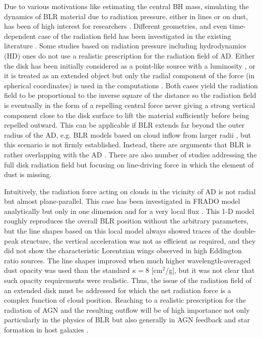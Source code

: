 \documentclass[twocolumn]{aastex62}
\begin{document}
Due to various motivations like estimating the central BH mass, simulating the dynamics of BLR material due to radiation pressure, either in lines or on dust, has been of high interest for researchers \citep[e.g.][]{Marconi2008, NetzerMarziani2010, Wang2012b, Plewa2013, Shadmehri2015, Khajenabi2016}. Different geometries, and even time-dependent case of the radiation field has been investigated in the existing literature \citep[e.g.][]{Saslaw1978, Mioc1992, Liu2011, Krause2011}.
Some studies based on radiation pressure including hydrodynamics (HD) ones do not use a realistic prescription for the radiation field of AD. Either the disk has been initially considered as a point-like source with a luminosity \citep[e.g.][]{Donea2002, Mosallanezhad2019}, or it is treated as an extended object but only the radial component of the force (in spherical coordinates) is used in the computations \citep[e.g.][]{Risaliti2010}. Both cases yield the radiation field to be proportional to the inverse square of the distance so the radiation field is eventually in the form of a repelling central force never giving a strong vertical component close to the disk surface to lift the material sufficiently before being repelled outward. This can be applicable if BLR extends far beyond the outer radius of the AD, e.g. BLR models based on cloud inflow from larger radii \citep{Wang2017}, but this scenario is not firmly established. Instead, there are arguments that BLR is rather overlapping with the AD \citep[e.g.][]{kura2004}. There are also number of studies \citep[e.g.][]{proga1998, proga2000, proga2004, Nomura2020, Mizumoto2021} addressing the full disk radiation field but focusing on line-driving force in which the element of dust is missing.

Intuitively, the radiation force acting on clouds in the vicinity of AD is not radial but almost plane-parallel. This case has been investigated in FRADO model analytically but only in one dimension and for a very local flux \cite{Czerny2015,Czerny2017}. This 1-D model roughly reproduces the overall BLR position without the arbitrary parameters, but the line shapes based on this local model always showed traces of the double-peak structure, the vertical acceleration was not as efficient as required, and they did not show the characteristic Lorentzian wings observed in high Eddington ratio sources. The line shapes improved when much higher wavelength-averaged dust opacity was used than the standard $\kappa = 8$ [cm$^2$/g], but it was not clear that such opacity requirements were realistic. Thus, the issue of the radiation field of an extended disk must be addressed for which the net radiation force is a complex function of cloud position. Reaching to a realistic prescription for the radiation of AGN and the resulting outflow will be of high importance not only particularly in the physics of BLR but also generally in AGN feedback and star formation in host galaxies \citep{Croton2006, Raouf2019}.
\end{document}
